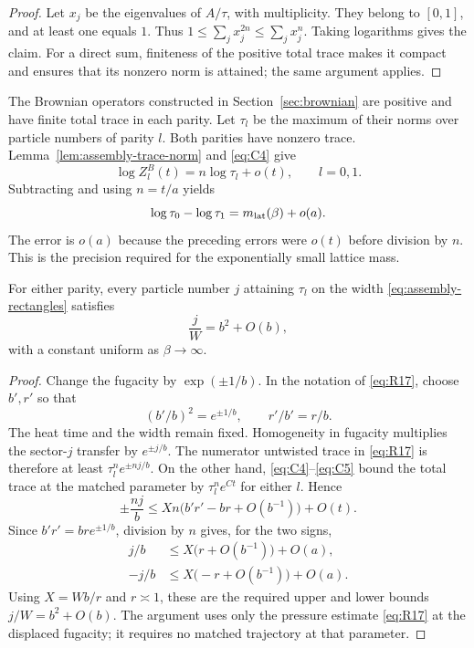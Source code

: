 \begin{proof}
Let $x_j$ be the eigenvalues of $A/\tau$, with multiplicity. They belong
to $[0,1]$, and at least one equals $1$. Thus
$1\le\sum_jx_j^{2n}\le\sum_jx_j^n$. Taking logarithms gives the
claim. For a direct sum, finiteness of the positive total trace makes it
compact and ensures that its nonzero norm is attained; the same argument
applies.
\end{proof}

The Brownian operators constructed in Section~\ref{sec:brownian} are
positive and have finite total trace in each parity. Let $\tau_l$ be the
maximum of their norms over particle numbers of parity $l$. Both parities
have nonzero trace. Lemma~\ref{lem:assembly-trace-norm} and
\eqref{eq:C4} give
\[
 \log Z_l^B(t)=n\log\tau_l+o(t),\qquad l=0,1.
\]
Subtracting and using $n=t/a$ yields
\begin{equation}
 \log\tau_0-\log\tau_1=m_{\rm lat}(\beta)+o(a).
 \label{eq:C5}
\end{equation}
The error is $o(a)$ because the preceding errors were $o(t)$ before
division by $n$. This is the precision required for the exponentially
small lattice mass.

\begin{lemma}
\label{lem:assembly-particle-density}
For either parity, every particle number $j$ attaining $\tau_l$ on the
width \eqref{eq:assembly-rectangles} satisfies
\[
 \frac jW=b^2+O(b),
\]
with a constant uniform as $\beta\to\infty$.
\end{lemma}

\begin{proof}
Change the fugacity by $\exp(\pm1/b)$. In the notation of
\eqref{eq:R17}, choose $b',r'$ so that
\[
 (b'/b)^2=e^{\pm1/b},\qquad r'/b'=r/b.
\]
The heat time and the width remain fixed. Homogeneity in fugacity
multiplies the sector-$j$ transfer by $e^{\pm j/b}$. The numerator
untwisted trace in \eqref{eq:R17} is therefore at least
$\tau_l^n e^{\pm nj/b}$. On the other hand,
\eqref{eq:C4}--\eqref{eq:C5} bound the total trace at the matched
parameter by $\tau_l^n e^{Ct}$ for either $l$. Hence
\[
 \pm\frac{nj}{b}
   \le Xn\bigl(b'r'-br+O(b^{-1})\bigr)+O(t).
\]
Since $b'r'=br e^{\pm1/b}$, division by $n$ gives, for the two signs,
\[
 \begin{aligned}
 j/b&\le X\bigl(r+O(b^{-1})\bigr)+O(a),\\
 -j/b&\le X\bigl(-r+O(b^{-1})\bigr)+O(a).
 \end{aligned}
\]
Using $X=Wb/r$ and $r\asymp1$, these are the required upper and lower
bounds $j/W=b^2+O(b)$. The argument uses only the pressure estimate
\eqref{eq:R17} at the displaced fugacity; it requires no matched
trajectory at that parameter.
\end{proof}

